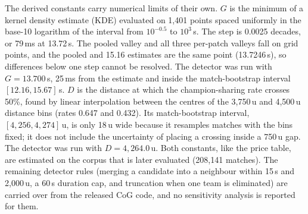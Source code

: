 The derived constants carry numerical limits of their own. $G$ is the minimum of a kernel density
estimate (KDE) evaluated on 1,401 points spaced uniformly in the base-10 logarithm of the interval
from $10^{-0.5}$ to $10^{3}$\,s. The step is 0.0025 decades, or 79\,ms at 13.72\,s.
The pooled valley and all three per-patch valleys fall on grid points, and the pooled and 15.16
estimates are the same point (13.7246\,s), so differences below one step cannot be resolved. The
detector was run with $G = 13.700$\,s, 25\,ms from the estimate and inside the match-bootstrap
interval $[12.16, 15.67]$\,s.
$D$ is the distance at which the champion-sharing rate crosses 50\%, found by linear interpolation
between the centres of the 3,750\,u and 4,500\,u distance bins (rates 0.647 and 0.432). Its
match-bootstrap interval, $[4{,}256, 4{,}274]$\,u, is only 18\,u wide because it resamples matches
with the bins fixed; it does not include the uncertainty of placing a crossing inside a 750\,u gap.
The detector was run with $D = 4{,}264.0$\,u.
Both constants, like the price table, are estimated on the corpus that is later evaluated
(208,141 matches).
The remaining detector rules (merging a candidate into a neighbour within 15\,s and 2,000\,u, a
60\,s duration cap, and truncation when one team is eliminated) are carried over from the
released CoG code, and no sensitivity analysis is reported for them.

